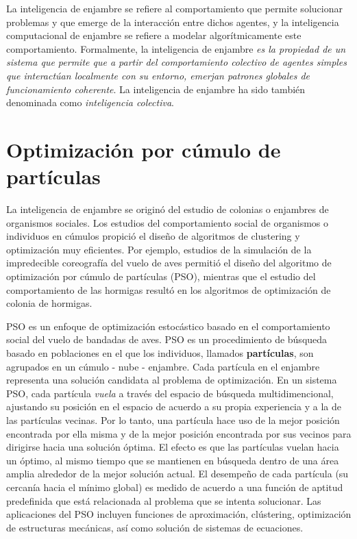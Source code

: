 \documentclass{article}
\begin{document}
La inteligencia de enjambre se refiere al comportamiento que permite solucionar problemas y que emerge de la interacción entre dichos agentes, y la inteligencia computacional de enjambre se refiere a modelar algorítmicamente este comportamiento.
Formalmente, la inteligencia de enjambre \emph{es la propiedad de un sistema que permite que a partir del comportamiento colectivo de agentes simples que interactúan localmente con su entorno, emerjan patrones globales de funcionamiento coherente}.
La inteligencia de enjambre ha sido también denominada como \emph{inteligencia colectiva}.


\section{Optimización por cúmulo de partículas}

La inteligencia de enjambre se originó del estudio de colonias o enjambres de organismos sociales.
Los estudios del comportamiento social de organismos o individuos en cúmulos propició el diseño de algoritmos de clustering y optimización muy eficientes.
Por ejemplo, estudios de la simulación de la impredecible coreografía del vuelo de aves permitió el diseño del algoritmo de optimización por cúmulo de partículas (PSO), mientras que el estudio del comportamiento de las hormigas resultó en los algoritmos de optimización de colonia de hormigas.


PSO es un enfoque de optimización estocástico basado en el comportamiento social del vuelo de bandadas de aves.
PSO es un procedimiento de búsqueda basado en poblaciones en el que los individuos, llamados \textbf{partículas}, son agrupados en un cúmulo - nube - enjambre.
Cada partícula en el enjambre representa una solución candidata al problema de optimización.
En un sistema PSO, cada partícula \emph{vuela} a través del espacio de búsqueda multidimencional, ajustando su posición en el espacio de acuerdo a su propia experiencia y a la de las partículas vecinas.
Por lo tanto, una partícula hace uso de la mejor posición encontrada por ella misma y de la mejor posición encontrada por sus vecinos para dirigirse hacia una solución óptima.
El efecto es que las partículas vuelan hacia un óptimo, al mismo tiempo que se mantienen en búsqueda dentro de una área amplia alrededor de la mejor solución actual.
El desempeño de cada partícula (su cercanía hacia el mínimo global) es medido de acuerdo a una función de aptitud predefinida que está relacionada al problema que se intenta solucionar.
Las aplicaciones del PSO incluyen funciones de aproximación, clústering, optimización de estructuras mecánicas, así como solución de sistemas de ecuaciones.
\end{document}
